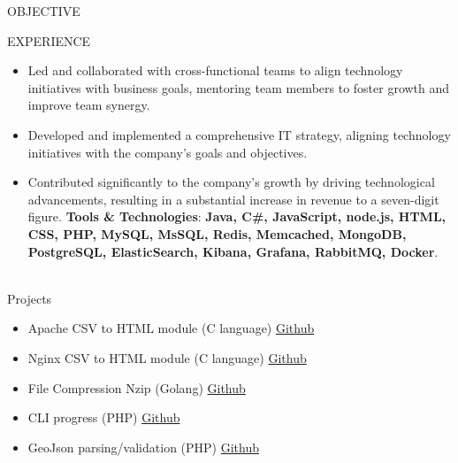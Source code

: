 \documentclass{resume} %
\begin{document}
\begin{rSection}{OBJECTIVE}
\begin{rSection}{EXPERIENCE}
\begin{itemize}
    \item Led and collaborated with cross-functional teams to align technology initiatives with business goals, mentoring team members to foster growth and improve team synergy.
\item Developed and implemented a comprehensive IT strategy, aligning technology initiatives with the
company's goals and objectives.
\item Contributed significantly to the company's growth by driving technological advancements, resulting in a
substantial increase in revenue to a seven-digit figure.
     \textbf{Tools \& Technologies}: \textbf{Java, C\#, JavaScript, node.js, HTML, CSS, PHP, MySQL, MsSQL, Redis, Memcached, MongoDB, PostgreSQL, ElasticSearch, Kibana, Grafana, RabbitMQ, Docker}.
     \\ 
\\
 \end{itemize}
\end{rSection} 

\end{rSection}


\begin{rSection}{Projects}
 \begin{itemize}
    \itemsep -3pt {} 
\item Apache CSV to HTML module (C language) \href{https://github.com/nikopeikrishvili/apache_mod_csv_to_html}{Github}
\item Nginx CSV to HTML module (C language) \href{https://github.com/nikopeikrishvili/nginx_csv_to_html_module}{Github}
\item File Compression Nzip (Golang)  \href{https://github.com/nikopeikrishvili/nzip}{Github}
\item CLI progress (PHP) \href{https://github.com/nikopeikrishvili/progress}{Github}
\item GeoJson parsing/validation (PHP) \href{https://github.com/nikopeikrishvili/GeoJson/tree/main}{Github}
\\
\\
\end{itemize}
\end{rSection}

\end{document}
